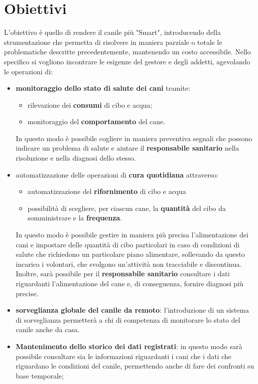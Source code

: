 \section{Obiettivi}
L'obiettivo è quello di rendere il canile più "Smart", introducendo della strumentazione che permetta di risolvere in maniera parziale o totale le problematiche descritte precedentemente, mantenendo un costo accessibile. 
Nello specifico si vogliono incontrare le esigenze del gestore e degli addetti, agevolando le operazioni di:
\begin{itemize}
    \item \textbf{monitoraggio dello stato di salute dei cani} tramite:
    \begin{itemize}
        \item rilevazione dei \textbf{consumi} di cibo e acqua;
        \item monitoraggio del \textbf{comportamento} del cane.
    \end{itemize}
    In questo modo è possibile cogliere in maniera preventiva segnali che possono indicare un problema di salute e aiutare il \textbf{responsabile sanitario} nella risoluzione e nella diagnosi dello stesso. 
    \item automatizzazione delle operazioni di
\textbf{cura quotidiana} attraverso:
    \begin{itemize}
        \item automatizzazione del \textbf{rifornimento} di cibo e acqua
        \item possibilità di scegliere, per ciascun cane, la \textbf{quantità} del cibo da somministrare e la \textbf{frequenza}.
    \end{itemize}
    In questo modo è possibile gestire in maniera più precisa l'alimentazione dei cani e impostare delle quantità di cibo particolari in caso di condizioni di salute che richiedono un particolare piano alimentare, sollevando da questo incarico i volontari, che svolgono un'attività non tracciabile e discontinua. Inoltre, sarà possibile per il \textbf{responsabile sanitario} consultare i dati riguardanti l'alimentazione del cane e, di conseguenza, fornire diagnosi più precise. 
    \item \textbf{sorveglianza
globale del canile da remoto}: l'introduzione di un sistema di sorveglianza permetterà a chi di competenza di monitorare lo stato del canile anche da casa.
\item \textbf{Mantenimento dello storico dei dati registrati}: in questo modo sarà possibile consultare sia le informazioni riguardanti i cani che i dati che riguardano le condizioni del canile, permettendo anche di fare dei confronti su base temporale;

\end{itemize}
